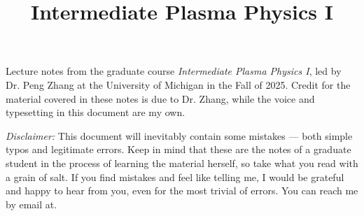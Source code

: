 \documentclass[a4paper]{article}
\title{Intermediate Plasma Physics I\vspace{-3em}}
\date{}
\begin{document}

    \maketitle

    Lecture notes from the graduate course \textit{Intermediate Plasma Physics I}, led by Dr. Peng Zhang at the University of Michigan in the Fall of 2025. Credit for the material covered in these notes is due to Dr. Zhang, while the voice and typesetting in this document are my own.

    \textit{Disclaimer:} This document will inevitably contain some mistakes --- both simple typos and legitimate errors. Keep in mind that these are the notes of a graduate student in the process of learning the material herself, so take what you read with a grain of salt. If you find mistakes and feel like telling me, I would be grateful and happy to hear from you, even for the most trivial of errors. You can reach me by email at.

    \restoregeometry
    \newpage

    \tableofcontents
    
    
    
    
\end{document}
